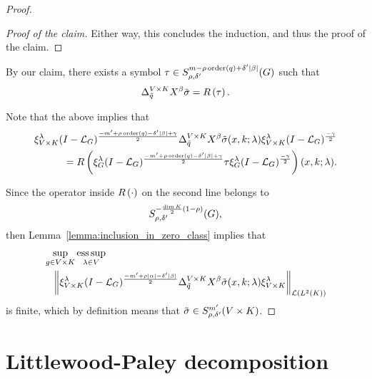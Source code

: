 \begin{proof}
\begin{proof}[Proof of the claim]
        Either way, this concludes the induction, and thus the proof of the claim.
    \end{proof}

    By our claim,
    there exists a symbol $\tau \in \SymbolClass {m - \rho \order(q) + \delta' \abs \beta} {\rho, \delta'}$ such that
    \begin{align*}
        \DifferenceOperator [\GroupDirect] {\tilde q} X^\beta \tilde \sigma = \InverseRotation \tau.
    \end{align*}

    Note that the above implies that
    \begin{align*}
        \Rep[\GroupDirect] \lambda \BesselPotential{-m' + \rho \order(q) - \delta' \abs \beta + \gamma} \DifferenceOperator [\GroupDirect] {\tilde q} X^\beta \tilde \sigma(x, k; \lambda) \Rep [\GroupDirect] \lambda \BesselPotential{-\gamma}\\
        = \InverseRotation {\Rep \lambda \BesselPotential{-m' + \rho \order(q) - \delta' \abs \beta + \gamma} \tau \Rep \lambda \BesselPotential{-\gamma}} (x, k; \lambda).
    \end{align*}

    Since the operator inside $\InverseRotation \dummy$ on the second line belongs to
    \begin{align*}
        \SymbolClass {-\frac {\dim \CompactGroup} 2 (1 - \rho) } {\rho, \delta'},
    \end{align*}
    then Lemma~\ref{lemma:inclusion_in_zero_class} implies that
    \begin{align*}
        &\sup_{g \in \GroupDirect} \esssup_{\lambda \in \VectorSpace}\\
        &\quad
        \norm [\Lin {\Lebesgue 2 \CompactGroup}] {%
            \Rep[\GroupDirect] \lambda \BesselPotential{-m' + \rho \abs \alpha  - \delta' \abs \beta} \DifferenceOperator [\GroupDirect] {\tilde q} X^\beta \tilde \sigma(x, k; \lambda) \Rep [\GroupDirect] \lambda
        }
    \end{align*}
    is finite,
    which by definition means that $\tilde \sigma \in \SymbolClass [\GroupDirect] {m'} {\rho, \delta'}$.
\end{proof}

\section{Littlewood-Paley decomposition}

